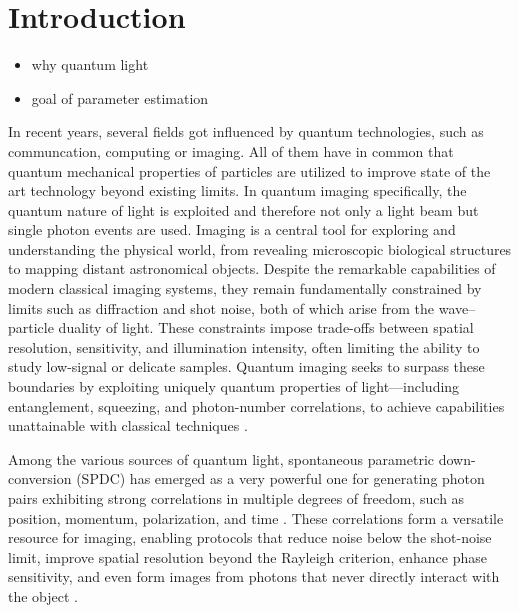 \section{Introduction}

\begin{itemize}
    \item why quantum light
    \item goal of parameter estimation
\end{itemize}
In recent years, several fields got influenced by quantum technologies, such as communcation, computing or imaging. All of them have in common that quantum mechanical properties of particles are utilized to improve state of the art technology beyond existing limits. \newline
In quantum imaging specifically, the quantum nature of light is exploited and therefore not only a light beam but single photon events are used. 
\newline
Imaging is a central tool for exploring and understanding the physical world, from revealing microscopic biological structures to mapping distant astronomical objects. Despite the remarkable capabilities of modern classical imaging systems, they remain fundamentally constrained by limits such as diffraction and shot noise, both of which arise from the wave--particle duality of light. These constraints impose trade-offs between spatial resolution, sensitivity, and illumination intensity, often limiting the ability to study low-signal or delicate samples. Quantum imaging seeks to surpass these boundaries by exploiting uniquely quantum properties of light---including entanglement, squeezing, and photon-number correlations, to achieve capabilities unattainable with classical techniques \cite{Defienne2024,Moreau2019}.

Among the various sources of quantum light, spontaneous parametric down-conversion (SPDC) has emerged as a very powerful one for generating photon pairs exhibiting strong correlations in multiple degrees of freedom, such as position, momentum, polarization, and time \cite{Moreau2019}. These correlations form a versatile resource for imaging, enabling protocols that reduce noise below the shot-noise limit, improve spatial resolution beyond the Rayleigh criterion, enhance phase sensitivity, and even form images from photons that never directly interact with the object \cite{Defienne2024,Moreau2019}. 

